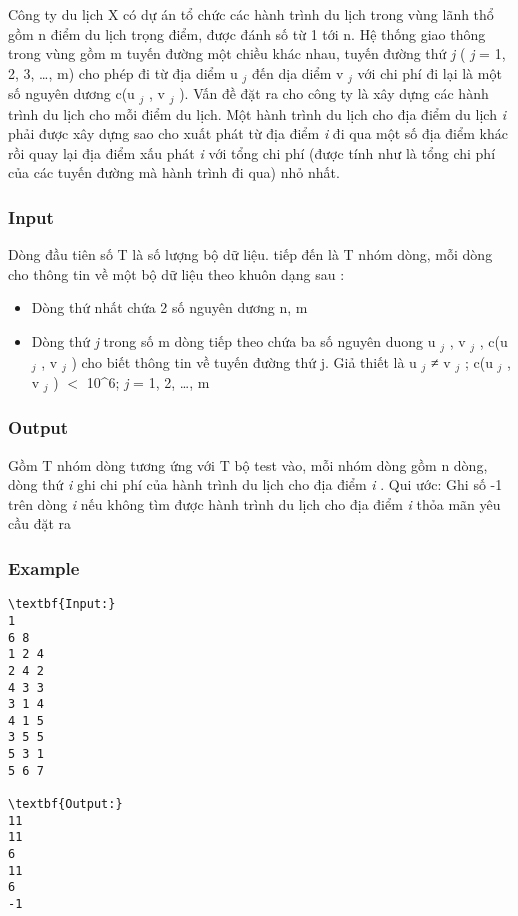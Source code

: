 

Công ty du lịch X có dự án tổ chức các hành trình du lịch trong vùng lãnh thổ gồm n điểm du lịch trọng điểm, được đánh số từ 1 tới n. Hệ thống giao thông trong vùng gồm m tuyến đường một chiều khác nhau, tuyến đường thứ \emph{ j } ( \emph{ j } = 1, 2, 3, …, m) cho phép đi từ địa diểm u $_ j $ đến dịa diểm v $_ j $ với chi phí đi lại là một số nguyên dương c(u $_ j $ , v $_ j $ ). Vấn đề đặt ra cho công ty là xây dựng các hành trình du lịch cho mỗi điểm du lịch. Một hành trình du lịch cho địa điểm du lịch \emph{ i } phải được xây dựng sao cho xuất phát từ địa điểm \emph{ i } đi qua một số địa điểm khác rồi quay lại địa điểm xấu phát \emph{ i } với tổng chi phí (được tính như là tổng chi phí của các tuyến đường mà hành trình đi qua) nhỏ nhất.

\subsubsection{Input}

Dòng đầu tiên số T là số lượng bộ dữ liệu. tiếp đến là T nhóm dòng, mỗi dòng cho thông tin về một bộ dữ liệu theo khuôn dạng sau :
\begin{itemize}
	\item Dòng thứ nhất chứa 2 số nguyên dương n, m
	\item Dòng thứ \emph{ j } trong số m dòng tiếp theo chứa ba số nguyên duong u $_ j $ , v $_ j $ , c(u $_ j $ , v $_ j $ ) cho biết thông tin về tuyến đường thứ j. Giả thiết là u $_ j $ ≠ v $_ j $ ; c(u $_ j $ , v $_ j $ ) $<$ 10^6; \emph{ j } = 1, 2, …, m
\end{itemize}

\subsubsection{Output}

Gồm T nhóm dòng tương ứng với T bộ test vào, mỗi nhóm dòng gồm n dòng, dòng thứ \emph{ i } ghi chi phí của hành trình du lịch cho địa điểm \emph{ i } . Qui ước: Ghi số -1 trên dòng \emph{ i } nếu không tìm được hành trình du lịch cho địa điểm \emph{ i } thỏa mãn yêu cầu đặt ra

\subsubsection{Example}
\begin{verbatim}
\textbf{Input:}
1
6 8
1 2 4
2 4 2
4 3 3
3 1 4
4 1 5
3 5 5
5 3 1
5 6 7

\textbf{Output:}
11
11
6
11
6
-1\end{verbatim}

